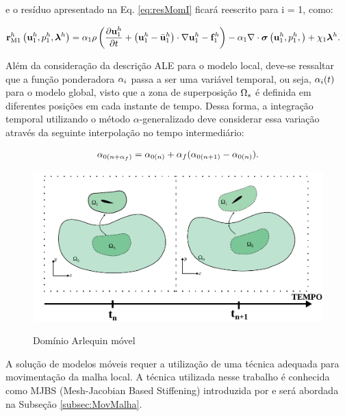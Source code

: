 \documentclass[tese_patricia]{subfiles}
\begin{document}
\noindent e o resíduo apresentado na Eq. \ref{eq:resMomI} ficará reescrito para i = 1, como:


\begin{align}
	\mathbf{r}_{\mathrm{M1}}^{h} \left(\mathbf{u}_1^h,p_1^h,\boldsymbol{\lambda}^h \right)&=\alpha_{1} \rho\left(\frac{\partial\mathbf{u}_1^h}{\partial t}+ \left(\mathbf{u}_1^h - \bar{\mathbf{u}}^h_{1}\right) \cdot \nabla\mathbf{u}_1^h  - \mathbf{f}_1^{h}\right) - \alpha_{1} \nabla \cdot \boldsymbol{\sigma}\left(\mathbf{u}_1^h,p_1^h,\right)+ \chi_{1} \boldsymbol{\lambda}^h \label{eq:resMomARLQALE}.
\end{align}

Além da consideração da descrição ALE para o modelo local, deve-se ressaltar que a função ponderadora $\alpha_{i}$ passa a ser uma variável temporal, ou seja, $\alpha_{i}(t)$ para o modelo global, visto que a zona de superposição $\Omega_s$ é definida em diferentes posições em cada instante de tempo. Dessa forma, a integração temporal utilizando o método $\alpha$-generalizado deve considerar essa variação através da seguinte interpolação no tempo intermediário:

\begin{align}
	\alpha_{0(n+\alpha_f)} = \alpha_{0(n)} + \alpha_f(\alpha_{0(n+1)} - \alpha_{0(n)}).
\end{align}

\begin{figure}[htb!]
	\centering 
	{\includegraphics[scale=1.0,trim=0cm 0cm 0cm 0cm, clip=true]{Imagens/Cap6/dominioArlequinMoving.pdf}}	
	\caption{Domínio Arlequin móvel}
	\label{fig:ArlquinMóvel}
\end{figure}

A solução de modelos móveis requer a utilização de uma técnica adequada para movimentação da malha local. A técnica utilizada nesse trabalho é conhecida como MJBS (Mesh-Jacobian Based Stiffening) introduzida por  e será abordada na Subseção \ref{subsec:MovMalha}.
\end{document}
